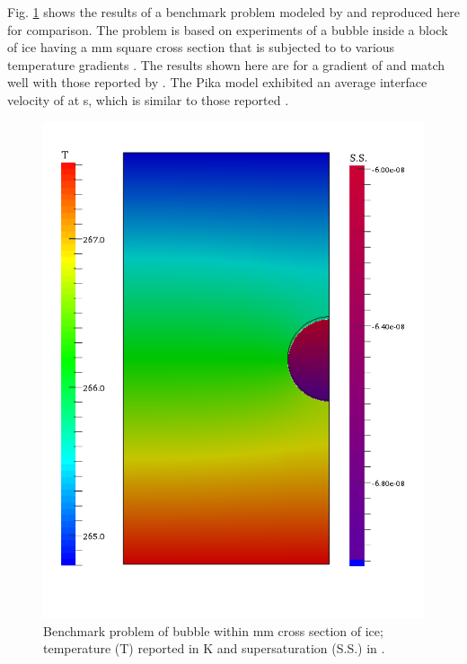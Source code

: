Fig. \ref{fig:bubble} shows the results of a benchmark problem modeled by \citet{kaempfer2009phase} and reproduced here for comparison. The problem is based on experiments of a bubble inside a block of ice having a \unit[5]{mm} square cross section that is subjected to to various temperature gradients \citep{nakaya1956technical, stehle1965technical}. The results shown here are for a gradient of  and match well with those reported by \citet{kaempfer2009phase}. The Pika model exhibited an average interface velocity of  at \unit[7200]{s}, which is similar to those reported \citet{kaempfer2009phase}.


\begin{figure}[t]
  \includegraphics[width=\linewidth]{figures/bubble.pdf}
  \caption{Benchmark problem of bubble within \unit[5]{mm} cross section of ice; temperature (T) reported in \unit[]{K} and supersaturation (S.S.) in .}
  \label{fig:bubble}
\end{figure}

